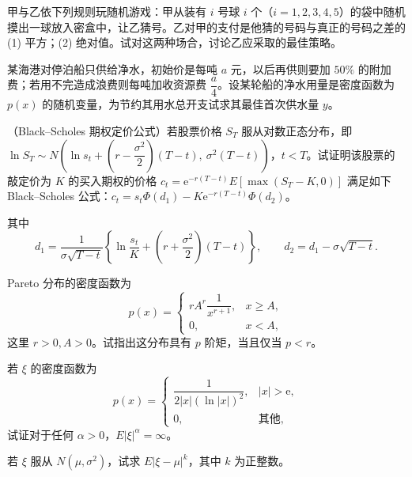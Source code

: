 \documentclass[../../main.tex]{subfiles}
\begin{document}
\begin{exercise}\label{exercise:ch04-23}
甲与乙依下列规则玩随机游戏：甲从装有 $i$ 号球 $i$ 个（$i=1,2,3,4,5$）的袋中随机摸出一球放入密盒中，让乙猜号。乙对甲的支付是他猜的号码与真正的号码之差的 (1) 平方；(2) 绝对值。试对这两种场合，讨论乙应采取的最佳策略。
\end{exercise}

\begin{exercise}\label{exercise:ch04-24}
某海港对停泊船只供给净水，初始价是每吨 $a$ 元，以后再供则要加 $50\%$ 的附加费；若用不完造成浪费则每吨加收资源费 $\dfrac{a}{4}$。设某轮船的净水用量是密度函数为 $p(x)$ 的随机变量，为节约其用水总开支试求其最佳首次供水量 $y$。
\end{exercise}

\begin{exercise}\label{exercise:ch04-25}
（Black--Scholes 期权定价公式）若股票价格 $S_T$ 服从对数正态分布，即 $\ln S_T\sim N\left(\ln s_t+\left(r-\dfrac{\sigma^2}{2}\right)(T-t),\ \sigma^2(T-t)\right)$，$t<T$。试证明该股票的敲定价为 $K$ 的买入期权的价格 $c_t=\mathrm{e}^{-r(T-t)}E[\max(S_T-K,0)]$ 满足如下 Black--Scholes 公式：$c_t=s_t\Phi(d_1)-K\mathrm{e}^{-r(T-t)}\Phi(d_2)$。

其中
\[
d_1=\frac{1}{\sigma\sqrt{T-t}}\left\{\ln\frac{s_t}{K}+\left(r+\frac{\sigma^2}{2}\right)(T-t)\right\},\qquad d_2=d_1-\sigma\sqrt{T-t}.
\]
\end{exercise}

\begin{exercise}\label{exercise:ch04-26}
Pareto 分布的密度函数为
\[
p(x)=\begin{cases}
rA^r\dfrac{1}{x^{r+1}},&x\geqslant A,\\
0,&x<A,
\end{cases}
\]
这里 $r>0,A>0$。试指出这分布具有 $p$ 阶矩，当且仅当 $p<r$。
\end{exercise}

\begin{exercise}\label{exercise:ch04-27}
若 $\xi$ 的密度函数为
\[
p(x)=\begin{cases}
\dfrac{1}{2|x|(\ln|x|)^2},&|x|>\mathrm{e},\\
0,&\text{其他},
\end{cases}
\]
试证对于任何 $\alpha>0$，$E|\xi|^\alpha=\infty$。
\end{exercise}

\begin{exercise}\label{exercise:ch04-28}
若 $\xi$ 服从 $N(\mu,\sigma^2)$，试求 $E|\xi-\mu|^k$，其中 $k$ 为正整数。
\end{exercise}
\end{document}
